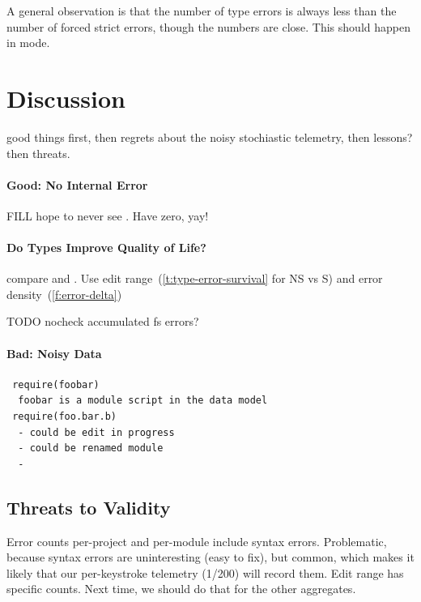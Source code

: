 \documentclass[english,submission,cleveref]{programming}
\begin{document}
A general observation is that the number of type errors is always less than the number of forced strict
errors, though the numbers are close.
This should happen in \mstrict{} mode.


\section{Discussion}
\label{s:discussion}

\FILL{} good things first,
then regrets about the noisy stochiastic telemetry,
then lessons?
then threats.

\paragraph{Good: No Internal Error}

FILL hope to never see .
Have zero, yay!


\paragraph{Do Types Improve Quality of Life?}

\FILL{} compare \mnonstrict{} and \mstrict{}.
Use edit range~(\cref{t:type-error-survival} for NS vs S)
and error density~(\cref{f:error-delta})

TODO nocheck accumulated fs errors?



\paragraph{Bad: Noisy Data}

\begin{verbatim}
 require(foobar)
  foobar is a module script in the data model
 require(foo.bar.b)
  - could be edit in progress
  - could be renamed module
  - 
\end{verbatim}



\subsection{Threats to Validity}
\label{s:threats}

Error counts per-project and per-module include syntax errors.
Problematic, because syntax errors are uninteresting (easy to fix),
but common, which makes it likely that our per-keystroke telemetry (1/200) will record them.
Edit range has specific counts.
Next time, we should do that for the other aggregates.
\end{document}
